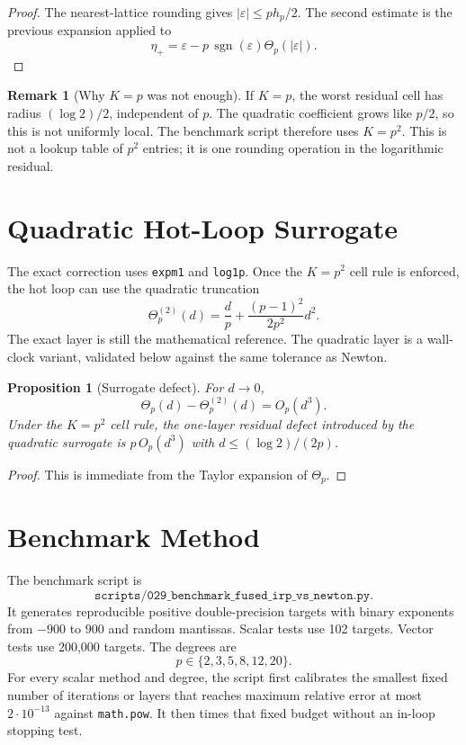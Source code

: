 \documentclass[10pt,a4paper]{article}
\theoremstyle{plain}
\newtheorem{proposition}[theorem]{Proposition}
\theoremstyle{definition}
\newtheorem{remark}[theorem]{Remark}
\newcommand{\eps}{\varepsilon}
\begin{document}
\begin{proof}
The nearest-lattice rounding gives $|\eps|\le ph_p/2$.  The second estimate is
the previous expansion applied to
\[
  \eta_+=\eps-p\,\operatorname{sgn}(\eps)\Theta_p(|\eps|).
\]
\end{proof}

\begin{remark}[Why $K=p$ was not enough]
If $K=p$, the worst residual cell has radius $(\log2)/2$, independent of $p$.
The quadratic coefficient grows like $p/2$, so this is not uniformly local.
The benchmark script therefore uses $K=p^2$.  This is not a lookup table of
$p^2$ entries; it is one rounding operation in the logarithmic residual.
\end{remark}

\section{Quadratic Hot-Loop Surrogate}

The exact correction uses \texttt{expm1} and \texttt{log1p}.  Once the
$K=p^2$ cell rule is enforced, the hot loop can use the quadratic truncation
\[
  \Theta^{(2)}_p(d)
    =\frac{d}{p}+\frac{(p-1)^2}{2p^2}d^2.
\]
The exact layer is still the mathematical reference.  The quadratic layer is a
wall-clock variant, validated below against the same tolerance as Newton.

\begin{proposition}[Surrogate defect]
For $d\to0$,
\[
  \Theta_p(d)-\Theta^{(2)}_p(d)=O_p(d^3).
\]
Under the $K=p^2$ cell rule, the one-layer residual defect introduced by the
quadratic surrogate is $p\,O_p(d^3)$ with $d\le(\log2)/(2p)$.
\end{proposition}

\begin{proof}
This is immediate from the Taylor expansion of $\Theta_p$.
\end{proof}

\section{Benchmark Method}

The benchmark script is
\[
  \texttt{scripts/029\_benchmark\_fused\_irp\_vs\_newton.py}.
\]
It generates reproducible positive double-precision targets with binary
exponents from $-900$ to $900$ and random mantissas.  Scalar tests use 102
targets.  Vector tests use 200,000 targets.  The degrees are
\[
  p\in\{2,3,5,8,12,20\}.
\]
For every scalar method and degree, the script first calibrates the smallest
fixed number of iterations or layers that reaches maximum relative error at
most $2\cdot10^{-13}$ against \texttt{math.pow}.  It then times that fixed
budget without an in-loop stopping test.
\end{document}
